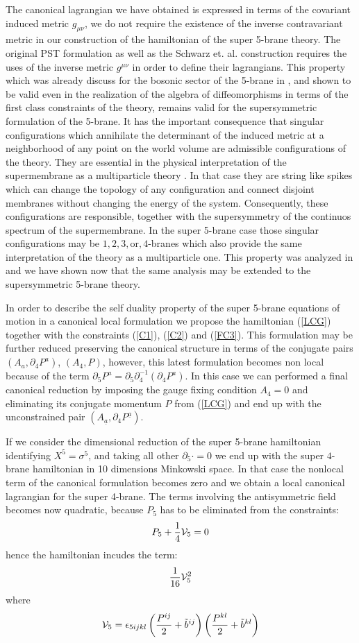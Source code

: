 \documentclass[a4paper,12pt]{article}
\def\CV{\cal{V}}
\def\a{\underline{a}}
\begin{document}
The canonical lagrangian we have obtained is expressed in terms of
the covariant induced metric $g_{\mu\nu}$, we do not require the
existence of the inverse contravariant metric in our construction
of the hamiltonian of the super 5-brane theory. The original PST
formulation as well as the Schwarz et. al. construction requires
the uses of the inverse metric $g^{\mu\nu}$ in order to define
their lagrangians. This property which was already discuss for the
bosonic sector of the 5-brane in \cite{DeCastro:2001gp}, and shown
to be valid even in the realization of the algebra of
diffeomorphisms  in terms of the first class constraints of the
theory, remains valid for the supersymmetric formulation of the
5-brane. It has the important consequence that singular
configurations which annihilate the determinant of the induced
metric at a neighborhood of any point on the world volume are
admissible configurations of the theory. They are essential in the
physical interpretation of the supermembrane as a multiparticle
theory \cite{deWit:1988ig} \cite{Nicolai:1998ic}. In that case
they are string like spikes which can change the topology of any
configuration and connect  disjoint membranes without changing the
energy of the system. Consequently, these configurations are
responsible, together with the supersymmetry of the continuos
spectrum of the supermembrane. In the super 5-brane case those
singular configurations  may be $1,2,3,\mbox{or},4$-branes which
also provide the same interpretation of the theory as a
multiparticle one. This property was analyzed in
\cite{DeCastro:2001gp} and we have shown now that the same
analysis may be extended to the supersymmetric 5-brane theory.


In order to describe the self duality property of the super
5-brane equations of motion in a canonical local formulation we
propose the hamiltonian (\ref{LCG}) together with the constraints
(\ref{C1}), (\ref{C2}) and (\ref{FC3}). This formulation may be
further reduced preserving the canonical structure in terms of the
conjugate pairs $(A_a, \partial_4P^a)$, $(A_4, P)$, however, this
latest formulation becomes non local because of the term
$\partial_5P^a=\partial_5\partial_4^{-1}(\partial_4P^a)$. In this
case we can performed a final canonical reduction by imposing the
gauge fixing condition  $A_4=0$ and eliminating its conjugate
momentum $P$ from (\ref{LCG}) and end up with the unconstrained
pair $(A_{\a}, \partial_4P^{\a})$.



If we consider the dimensional reduction of the super 5-brane
hamiltonian identifying  $X^5=\sigma^5$, and taking all other
$\partial_5\cdot=0$ we end up with the super $4$-brane hamiltonian
in 10 dimensions Minkowski space. In that case the nonlocal term
of the  canonical formulation becomes zero and we obtain a local
canonical lagrangian for the super 4-brane. The terms involving
the antisymmetric field becomes now quadratic, because $P_5$ has
to be eliminated from the constraints:
\[P_5+{1\over 4}{\CV}_5=0\]
\[
\]
hence the hamiltonian incudes the term:
\[ {1\over 16} {\CV}_5^2 \]
where
\[
{\CV}_5=\epsilon_{5ijkl}\left({{P^{ij}}\over2}+\tilde{b}^{ij}
\right)\left({{P^{kl}}\over2}+\tilde{b}^{kl} \right)
\]
\end{document}
